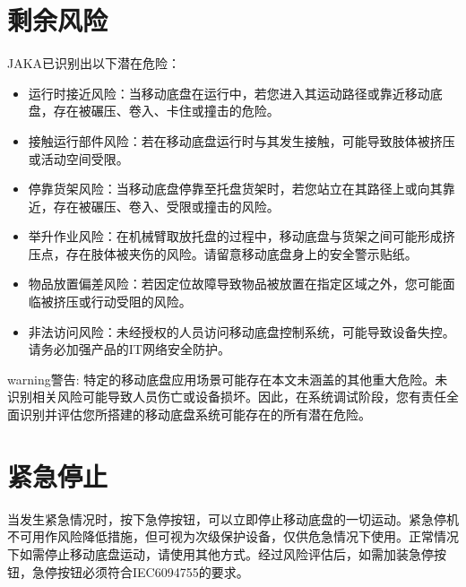 \documentclass[a4paper,11pt,english,openany,oneside]{sphinxmanual}
\begin{document}
\section{剩余风险}
\label{\detokenize{05 _u5b89_u5168_u89c4_u8303:id10}}
\sphinxAtStartPar
JAKA已识别出以下潜在危险：
\begin{itemize}
\item {} 
\sphinxAtStartPar
运行时接近风险：当移动底盘在运行中，若您进入其运动路径或靠近移动底盘，存在被碾压、卷入、卡住或撞击的危险。

\item {} 
\sphinxAtStartPar
接触运行部件风险：若在移动底盘运行时与其发生接触，可能导致肢体被挤压或活动空间受限。

\item {} 
\sphinxAtStartPar
停靠货架风险：当移动底盘停靠至托盘货架时，若您站立在其路径上或向其靠近，存在被碾压、卷入、受限或撞击的风险。

\item {} 
\sphinxAtStartPar
举升作业风险：在机械臂取放托盘的过程中，移动底盘与货架之间可能形成挤压点，存在肢体被夹伤的风险。请留意移动底盘身上的安全警示贴纸。

\item {} 
\sphinxAtStartPar
物品放置偏差风险：若因定位故障导致物品被放置在指定区域之外，您可能面临被挤压或行动受阻的风险。

\item {} 
\sphinxAtStartPar
非法访问风险：未经授权的人员访问移动底盘控制系统，可能导致设备失控。请务必加强产品的IT网络安全防护。

\end{itemize}

\begin{sphinxadmonition}{warning}{警告:}
\sphinxAtStartPar
特定的移动底盘应用场景可能存在本文未涵盖的其他重大危险。未识别相关风险可能导致人员伤亡或设备损坏。因此，在系统调试阶段，您有责任全面识别并评估您所搭建的移动底盘系统可能存在的所有潜在危险。
\end{sphinxadmonition}


\section{紧急停止}
\label{\detokenize{05 _u5b89_u5168_u89c4_u8303:id11}}
\sphinxAtStartPar
当发生紧急情况时，按下急停按钮，可以立即停止移动底盘的一切运动。紧急停机不可用作风险降低措施，但可视为次级保护设备，仅供危急情况下使用。正常情况下如需停止移动底盘运动，请使用其他方式。经过风险评估后，如需加装急停按钮，急停按钮必须符合IEC\sphinxhyphen{}60947\sphinxhyphen{}5\sphinxhyphen{}5的要求。
\end{document}
